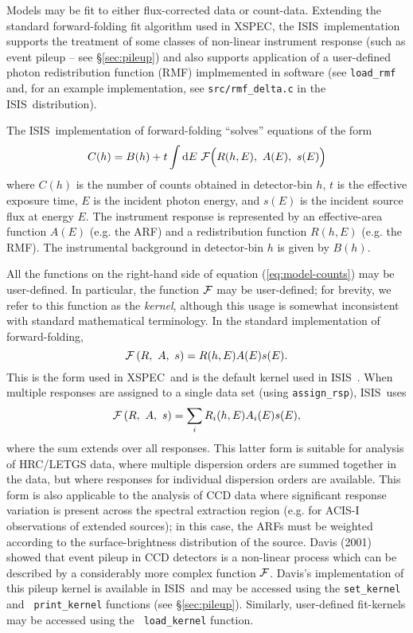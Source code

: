 \documentclass{book}
\newcommand{\D}{{\rm d}}
\newcommand{\isisx}{{\sc ISIS~}}
\newcommand{\xspec}{{\sc XSPEC}}
\begin{document}
Models may be fit to either flux-corrected data or count-data.
Extending the standard forward-folding fit algorithm used in \xspec,
the \isisx implementation supports the treatment of some classes of
non-linear instrument response (such as event pileup -- see
\S\ref{sec:pileup}) and also supports application of a user-defined
photon redistribution function (RMF) implmemented in software (see
{\tt load\_rmf} and, for an example implementation, see
\verb|src/rmf_delta.c| in the \isisx distribution).

The \isisx implementation of forward-folding ``solves'' equations
of the form
\begin{equation}
    C(h) = B(h) + t \int \D E~{\cal F}\Bigl(R(h,E),\ A(E),\ s(E)\Bigr)
\label{eq:model-counts}
\end{equation}
where $C(h)$ is the number of counts obtained in detector-bin $h$,
$t$ is the effective exposure time, $E$ is the incident photon energy, and
$s(E)$ is the incident source flux at energy $E$.  The instrument response
is represented by an effective-area function $A(E)$ (e.g. the ARF)
and a redistribution function $R(h, E)$ (e.g. the RMF).  The
instrumental background in detector-bin $h$ is given by $B(h)$.

All the functions on the right-hand side of equation
(\ref{eq:model-counts}) may be user-defined.  In particular, the
function ${\cal F}$ may be user-defined; for brevity, we refer to
this function as the {\it kernel}, although this usage is somewhat
inconsistent with standard mathematical terminology. In the
standard implementation of forward-folding,
\begin{equation}
   {\cal F}\left(R,\ A,\ s\right) = R(h,E)A(E)s(E).
\end{equation}
This is the form used in \xspec\  and is the default kernel used in
\isisx.  When multiple responses are assigned to a single data set (using
{\tt assign\_rsp}), \isisx uses
\begin{equation}
   {\cal F}\left(R,\ A,\ s\right) = \sum_i R_i(h,E)A_i(E)s(E),
\end{equation}
where the sum extends over all responses.  This latter form is
suitable for analysis of HRC/LETGS data, where multiple dispersion
orders are summed together in the data, but where responses for
individual dispersion orders are available.  This form is also
applicable to the analysis of CCD data where significant response
variation is present across the spectral extraction region (e.g.
for ACIS-I observations of extended sources); in this case, the
ARFs must be weighted according to the surface-brightness
distribution of the source. Davis (2001) showed that event pileup
in CCD detectors is a non-linear process which can be described by
a considerably more complex function ${\cal F}$. Davis's
implementation of this pileup kernel is available in \isisx and
may be accessed using the {\tt set\_kernel} and {\tt
print\_kernel} functions (see \S\ref{sec:pileup}).  Similarly,
user-defined fit-kernels may be accessed using the {\tt
load\_kernel} function.
\end{document}
